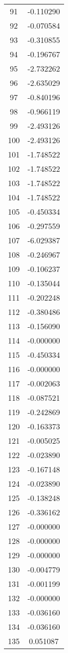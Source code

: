 \documentclass[12pt]{article}
\begin{document}
\begin{longtable}{@{}cc@{}}
91 & -0.110290 \\
92 & -0.070584 \\
93 & -0.310855 \\
94 & -0.196767 \\
95 & -2.732262 \\
96 & -2.635029 \\
97 & -0.840196 \\
98 & -0.966119 \\
99 & -2.493126 \\
100 & -2.493126 \\
101 & -1.748522 \\
102 & -1.748522 \\
103 & -1.748522 \\
104 & -1.748522 \\
105 & -0.450334 \\
106 & -0.297559 \\
107 & -6.029387 \\
108 & -0.246967 \\
109 & -0.106237 \\
110 & -0.135044 \\
111 & -0.202248 \\
112 & -0.380486 \\
113 & -0.156090 \\
114 & -0.000000 \\
115 & -0.450334 \\
116 & -0.000000 \\
117 & -0.002063 \\
118 & -0.087521 \\
119 & -0.242869 \\
120 & -0.163373 \\
121 & -0.005025 \\
122 & -0.023890 \\
123 & -0.167148 \\
124 & -0.023890 \\
125 & -0.138248 \\
126 & -0.336162 \\
127 & -0.000000 \\
128 & -0.000000 \\
129 & -0.000000 \\
130 & -0.004779 \\
131 & -0.001199 \\
132 & -0.000000 \\
133 & -0.036160 \\
134 & -0.036160 \\
135 & 0.051087 \\

\end{longtable}
\end{document}
